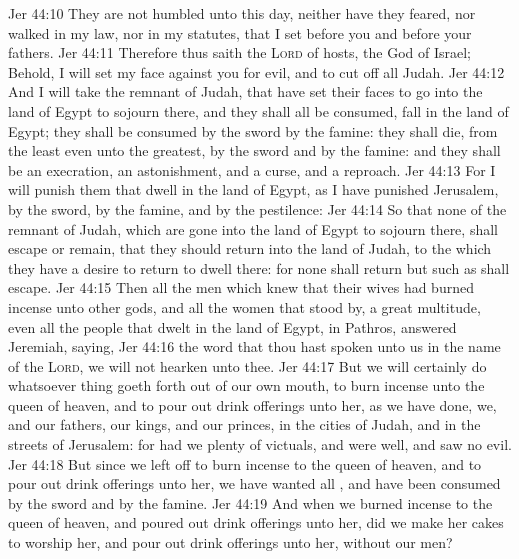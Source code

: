 \vs Jer 44:10 They are not humbled  unto this day, neither have they feared, nor walked in my law, nor in my statutes, that I set before you and before your fathers.
\vs Jer 44:11 Therefore thus saith the \textsc{Lord} of hosts, the God of Israel; Behold, I will set my face against you for evil, and to cut off all Judah.
\vs Jer 44:12 And I will take the remnant of Judah, that have set their faces to go into the land of Egypt to sojourn there, and they shall all be consumed,  fall in the land of Egypt; they shall  be consumed by the sword  by the famine: they shall die, from the least even unto the greatest, by the sword and by the famine: and they shall be an execration,  an astonishment, and a curse, and a reproach.
\vs Jer 44:13 For I will punish them that dwell in the land of Egypt, as I have punished Jerusalem, by the sword, by the famine, and by the pestilence:
\vs Jer 44:14 So that none of the remnant of Judah, which are gone into the land of Egypt to sojourn there, shall escape or remain, that they should return into the land of Judah, to the which they have a desire to return to dwell there: for none shall return but such as shall escape.
\vs Jer 44:15 Then all the men which knew that their wives had burned incense unto other gods, and all the women that stood by, a great multitude, even all the people that dwelt in the land of Egypt, in Pathros, answered Jeremiah, saying,
\vs Jer 44:16  the word that thou hast spoken unto us in the name of the \textsc{Lord}, we will not hearken unto thee.
\vs Jer 44:17 But we will certainly do whatsoever thing goeth forth out of our own mouth, to burn incense unto the queen of heaven, and to pour out drink offerings unto her, as we have done, we, and our fathers, our kings, and our princes, in the cities of Judah, and in the streets of Jerusalem: for  had we plenty of victuals, and were well, and saw no evil.
\vs Jer 44:18 But since we left off to burn incense to the queen of heaven, and to pour out drink offerings unto her, we have wanted all , and have been consumed by the sword and by the famine.
\vs Jer 44:19 And when we burned incense to the queen of heaven, and poured out drink offerings unto her, did we make her cakes to worship her, and pour out drink offerings unto her, without our men?
